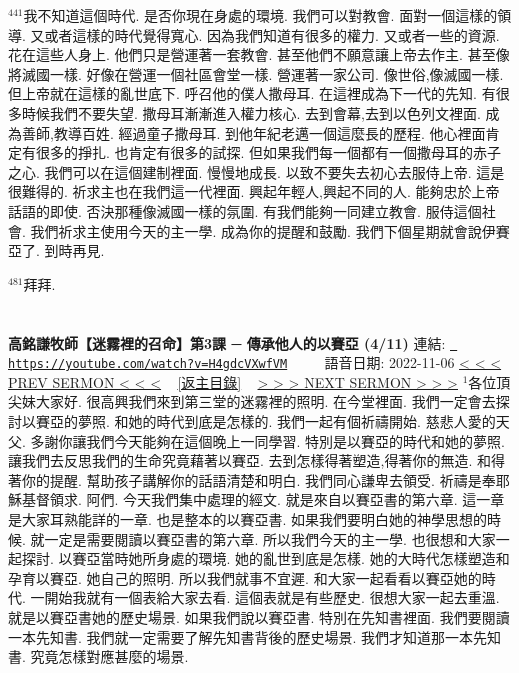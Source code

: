\documentclass{book}
\begin{document}
$^{441}$我不知道這個時代.
是否你現在身處的環境.
我們可以對教會.
面對一個這樣的領導.
又或者這樣的時代覺得寬心.
因為我們知道有很多的權力.
又或者一些的資源.
花在這些人身上.
他們只是營運著一套教會.
甚至他們不願意讓上帝去作主.
甚至像將滅國一樣.
好像在營運一個社區會堂一樣.
營運著一家公司.
像世俗,像滅國一樣.
但上帝就在這樣的亂世底下.
呼召他的僕人撒母耳.
在這裡成為下一代的先知.
有很多時候我們不要失望.
撒母耳漸漸進入權力核心.
去到會幕,去到以色列文裡面.
成為善師,教導百姓.
經過童子撒母耳.
到他年紀老邁一個這麼長的歷程.
他心裡面肯定有很多的掙扎.
也肯定有很多的試探.
但如果我們每一個都有一個撒母耳的赤子之心.
我們可以在這個建制裡面.
慢慢地成長.
以致不要失去初心去服侍上帝.
這是很難得的.
祈求主也在我們這一代裡面.
興起年輕人,興起不同的人.
能夠忠於上帝話語的即使.
否決那種像滅國一樣的氛圍.
有我們能夠一同建立教會.
服侍這個社會.
我們祈求主使用今天的主一學.
成為你的提醒和鼓勵.
我們下個星期就會說伊賽亞了.
到時再見.

$^{481}$拜拜.
\newpage



\section{}
\label{sec:H4gdcVXwfVM}
\textbf{高銘謙牧師【迷霧裡的召命】第3課 ─ 傳承他人的以賽亞 (4/11)}
\newline
\newline
連結: \href{https://youtube.com/watch?v=H4gdcVXwfVM}{\texttt{ https://youtube.com/watch?v=H4gdcVXwfVM}} ~~~~ 語音日期: 2022-11-06 
\newline
\newline
\hyperref[sec:djNxJ0pc_CU]{\small{< < < PREV SERMON < < <}}
~
\hyperref[sec:index]{\small{[返主目錄]}}
~
\hyperref[sec:gfNxrOBd_U0]{\small{> > > NEXT SERMON > > >}}
\newline
\newline
$^{1}$各位頂尖妹大家好.
很高興我們來到第三堂的迷霧裡的照明.
在今堂裡面.
我們一定會去探討以賽亞的夢照.
和她的時代到底是怎樣的.
我們一起有個祈禱開始.
慈悲人愛的天父.
多謝你讓我們今天能夠在這個晚上一同學習.
特別是以賽亞的時代和她的夢照.
讓我們去反思我們的生命究竟藉著以賽亞.
去到怎樣得著塑造,得著你的無造.
和得著你的提醒.
幫助孩子講解你的話語清楚和明白.
我們同心謙卑去領受.
祈禱是奉耶穌基督領求.
阿們.
今天我們集中處理的經文.
就是來自以賽亞書的第六章.
這一章是大家耳熟能詳的一章.
也是整本的以賽亞書.
如果我們要明白她的神學思想的時候.
就一定是需要閱讀以賽亞書的第六章.
所以我們今天的主一學.
也很想和大家一起探討.
以賽亞當時她所身處的環境.
她的亂世到底是怎樣.
她的大時代怎樣塑造和孕育以賽亞.
她自己的照明.
所以我們就事不宜遲.
和大家一起看看以賽亞她的時代.
一開始我就有一個表給大家去看.
這個表就是有些歷史.
很想大家一起去重溫.
就是以賽亞書她的歷史場景.
如果我們說以賽亞書.
特別在先知書裡面.
我們要閱讀一本先知書.
我們就一定需要了解先知書背後的歷史場景.
我們才知道那一本先知書.
究竟怎樣對應甚麼的場景.
\end{document}
